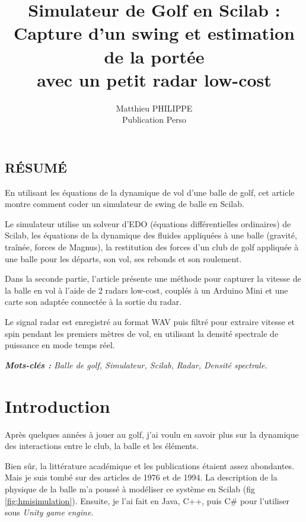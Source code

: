 \documentclass[10pt,a4paper]{report}
\author{Matthieu PHILIPPE\\Publication Perso}
\title{\textbf{Simulateur de Golf en Scilab :\\Capture d'un swing et estimation de la portée\\avec un petit radar low-cost}}
\begin{document}
\sffamily

\rmfamily\maketitle\sffamily
\tableofcontents
\listoffigures
\listoftables
\lstlistoflistings
\listofmyequations
\listofmyremarks
\listofmydefinitions

\newpage
\pagestyle{plainstar}
\section*{RÉSUMÉ}\setcounter{page}{1}
En utilisant les équations de la dynamique de vol d'une balle de golf, cet article montre comment coder un simulateur de swing de balle en Scilab.

Le simulateur utilise un solveur d'EDO (équations différentielles ordinaires) de Scilab, les équations de la dynamique des fluides appliquées à une balle (gravité, traînée, forces de Magnus), la restitution des forces d'un club de golf appliquée à une balle pour les départs, son vol, ses rebonds et son roulement. 

Dans la seconde partie, l'article présente une méthode pour capturer la vitesse de la balle en vol à l'aide de 2 radars low-cost, couplés à un Arduino Mini et une carte son adaptée connectée à la sortie du radar. 

Le signal radar est enregistré au format WAV puis filtré pour extraire vitesse et spin pendant les premiers mètres de vol, en utilisant la densité spectrale de puissance en mode temps réel.

\emph{\textbf{Mots-clés :} Balle de golf, Simulateur, Scilab, Radar, Densité spectrale.}

\chapter{Introduction}
Après quelques années à jouer au golf, j'ai voulu en savoir plus sur la dynamique des interactions entre le club, la balle et les éléments. 

Bien sûr, la littérature académique et les publications étaient assez abondantes. Mais je suis tombé sur des articles \cite{PWBJKH76} de 1976 et \cite{SASDR94} de 1994. La description de la physique de la balle m'a poussé à modéliser ce système en Scilab (fig \ref{fig:hmisimulation}). Ensuite, je l'ai fait en Java, C++, puis C\# pour l'utiliser sous \emph{Unity game engine}{\textregistered \texttrademark}.
\end{document}

